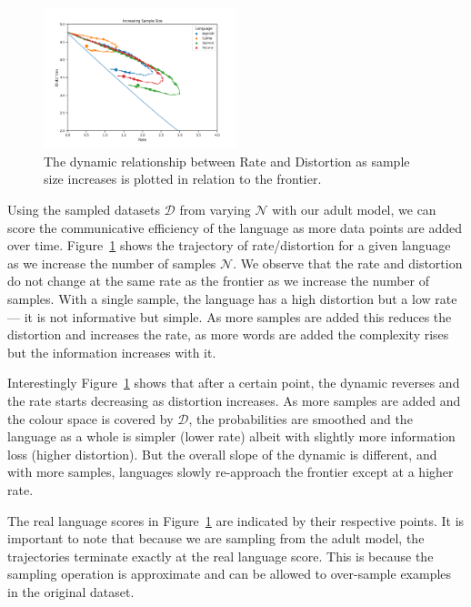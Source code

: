 \documentclass[11pt]{article}
\begin{document}
\begin{figure}
    \centering
    \includegraphics[width=0.5\textwidth]{docs/final_report_for_course/graphs/comm_sample_increase.png}
    \caption{The dynamic relationship between Rate and Distortion as sample size increases is plotted in relation to the frontier.}
    \label{fig:comm_sample_increase}
\end{figure}

Using the sampled datasets $\mathcal{D}$ from varying $\mathcal{N}$ with our adult model, we can score the communicative efficiency of the language as more data points are added over time.
Figure~\ref{fig:comm_sample_increase} shows the trajectory of rate/distortion for a given language as we increase the number of samples $\mathcal{N}$.
We observe that the rate and distortion do not change at the same rate as the frontier as we increase the number of samples.
With a single sample, the language has a high distortion but a low rate --- it is not informative but simple. 
As more samples are added this reduces the distortion and increases the rate, as more words are added the complexity rises but the information increases with it.

Interestingly Figure~\ref{fig:comm_sample_increase} shows that after a certain point, the dynamic reverses and the rate starts decreasing as distortion increases. 
As more samples are added and the colour space is covered by $\mathcal{D}$, the probabilities are smoothed and the language as a whole is simpler (lower rate) albeit with slightly more information loss (higher distortion).
But the overall slope of the dynamic is different, and with more samples, languages slowly re-approach the frontier except at a higher rate.

The real language scores in Figure~\ref{fig:comm_sample_increase} are indicated by their respective points.
It is important to note that because we are sampling from the adult model, the trajectories terminate exactly at the real language score.
This is because the sampling operation is approximate and can be allowed to over-sample examples in the original dataset.
\end{document}
